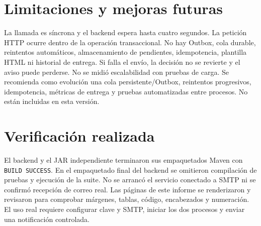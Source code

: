 \documentclass[11pt,a4paper]{article}
\begin{document}
\section{Limitaciones y mejoras futuras}
La llamada es síncrona y el backend espera hasta cuatro segundos. La petición HTTP ocurre dentro de la operación transaccional. No hay Outbox, cola durable, reintentos automáticos, almacenamiento de pendientes, idempotencia, plantilla HTML ni historial de entrega. Si falla el envío, la decisión no se revierte y el aviso puede perderse. No se midió escalabilidad con pruebas de carga.
Se recomienda como evolución una cola persistente/Outbox, reintentos progresivos, idempotencia, métricas de entrega y pruebas automatizadas entre procesos. No están incluidas en esta versión.

\section{Verificación realizada}
El backend y el JAR independiente terminaron sus empaquetados Maven con \texttt{BUILD SUCCESS}. En el empaquetado final del backend se omitieron compilación de pruebas y ejecución de la suite. No se arrancó el servicio conectado a SMTP ni se confirmó recepción de correo real.
Las páginas de este informe se renderizaron y revisaron para comprobar márgenes, tablas, código, encabezados y numeración. El uso real requiere configurar clave y SMTP, iniciar los dos procesos y enviar una notificación controlada.
\end{document}
